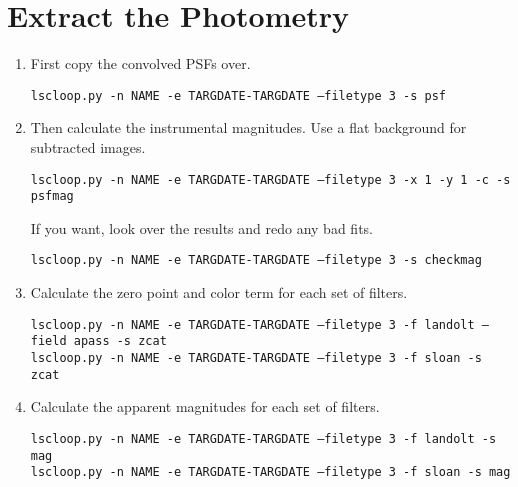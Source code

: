 \section{Extract the Photometry}
\begin{enumerate}

\item First copy the convolved PSFs over.

{\tt lscloop.py -n NAME -e TARGDATE-TARGDATE --filetype 3 -s psf}

\item Then calculate the instrumental magnitudes. Use a flat background for subtracted images.

{\tt lscloop.py -n NAME -e TARGDATE-TARGDATE --filetype 3 -x 1 -y 1 -c -s psfmag }

If you want, look over the results and redo any bad fits.

{\tt lscloop.py -n NAME -e TARGDATE-TARGDATE --filetype 3 -s checkmag}

\item Calculate the zero point and color term for each set of filters.

{\tt lscloop.py -n NAME -e TARGDATE-TARGDATE --filetype 3 -f landolt --field apass -s zcat }\\
{\tt lscloop.py -n NAME -e TARGDATE-TARGDATE --filetype 3 -f sloan -s zcat }

\item Calculate the apparent magnitudes for each set of filters.

{\tt lscloop.py -n NAME -e TARGDATE-TARGDATE --filetype 3 -f landolt -s mag }\\
{\tt lscloop.py -n NAME -e TARGDATE-TARGDATE --filetype 3 -f sloan -s mag }

\end{enumerate}
